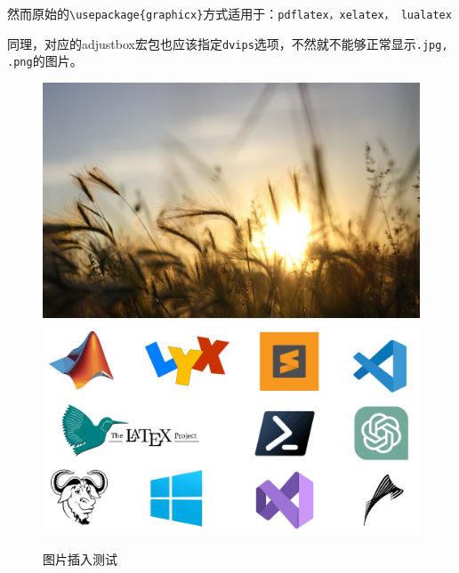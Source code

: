 \documentclass{utarticle}
\let\oldincludegraphics\includegraphics
\renewcommand{\includegraphics}[2][scale=1]{\oldincludegraphics[#1, angle=90]{#2}}
\begin{document}
然而原始的\verb|\usepackage{graphicx}|方式适用于：\verb|pdflatex，xelatex， lualatex|

同理，对应的adjustbox宏包也应该指定\verb|dvips|选项，不然就不能够正常显示\verb|.jpg, .png|的图片。

\vspace*{5em}
\begin{figure}[!htb]
    \centering
    \includegraphics[scale=.1]{./pics/wheat.jpg}
    \hspace*{10em}
    \includegraphics[scale=.35]{./pics/GNU_logo.pdf}
    \caption{图片插入测试}
    \label{图片插入测试}
\end{figure}


\clearpage
\thispagestyle{empty}
\begingroup
\color{white} 
\end{document}
